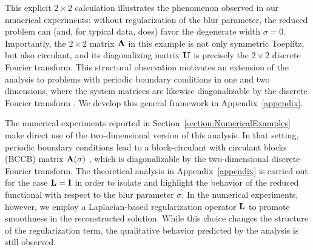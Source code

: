 \documentclass[onefignum,onetabnum]{siamart171218}
\newcommand{\bA}{{\bf A}}
\newcommand{\bI}{{\bf I}}
\newcommand{\bL}{{\bf L}}
\newcommand{\bU}{{\bf U}}
\begin{document}
This explicit $2\times2$ calculation illustrates the phenomenon observed in our
numerical experiments: without regularization of the blur parameter, the reduced
problem can (and, for typical data, does) favor the degenerate width $\sigma=0$.
Importantly, the $2\times2$ matrix $\bA$ in this example is not only symmetric
Toeplitz, but also circulant, and its diagonalizing matrix $\bU$ is precisely the
$2\times2$ discrete Fourier transform. This structural observation motivates an
extension of the analysis to problems with periodic boundary conditions in one and
two dimensions, where the system matrices are likewise diagonalizable by the
discrete Fourier transform \cite{deblurring}. We develop this general framework in
Appendix~\ref{appendix}. 

The numerical experiments reported in Section~\ref{section:NumericalExamples} make direct use of the
two-dimensional version of this analysis. In that setting, periodic boundary
conditions lead to a block-circulant with circulant blocks (BCCB) matrix
$\bA(\sigma)$ \cite{deblurring}, which is diagonalizable by the two-dimensional
discrete Fourier transform. The theoretical analysis in Appendix~\ref{appendix}
is carried out for the case $\bL=\bI$ in order to isolate and highlight the
behavior of the reduced functional with respect to the blur parameter $\sigma$.
In the numerical experiments, however, we employ a Laplacian-based regularization
operator $\bL$ to promote smoothness in the reconstructed solution. While this
choice changes the structure of the regularization term, the qualitative
behavior predicted by the analysis is still observed.
\end{document}
